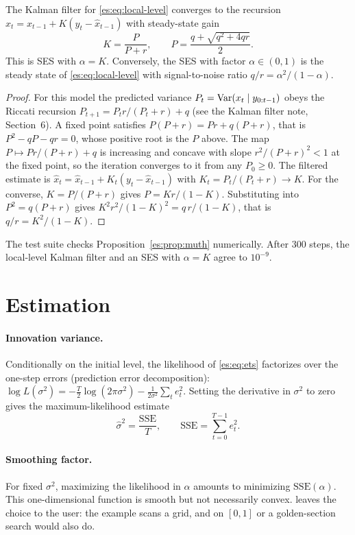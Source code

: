 \begin{proposition}\label{es:prop:muth}
The Kalman filter for \eqref{es:eq:local-level} converges to the recursion
$\hat x_t = \hat x_{t-1} + K(y_t-\hat x_{t-1})$ with steady-state gain
\[
  K = \frac{P}{P+r},\qquad P = \frac{q+\sqrt{q^2+4qr}}{2}.
\]
This is SES with $\alpha=K$. Conversely, the SES with factor $\alpha\in(0,1)$ is the steady state of
\eqref{es:eq:local-level} with signal-to-noise ratio $q/r = \alpha^2/(1-\alpha)$.
\end{proposition}
\begin{proof}
For this model the predicted variance $P_t=\operatorname{Var}(x_t\mid y_{0:t-1})$ obeys the
Riccati recursion $P_{t+1} = P_t r/(P_t+r) + q$ (see the Kalman filter note,
Section~6). A fixed point satisfies $P(P+r)=Pr+q(P+r)$, that is
$P^2-qP-qr=0$, whose positive root is the $P$ above. The map
$P\mapsto Pr/(P+r)+q$ is increasing and concave with slope $r^2/(P+r)^2<1$ at the
fixed point, so the iteration converges to it from any $P_0\ge0$. The filtered
estimate is $\hat x_t = \hat x_{t-1} + K_t(y_t-\hat x_{t-1})$ with
$K_t=P_t/(P_t+r)\to K$. For the converse, $K=P/(P+r)$ gives $P=Kr/(1-K)$.
Substituting into $P^2=q(P+r)$ gives $K^2r^2/(1-K)^2 = q\,r/(1-K)$, that is $q/r=K^2/(1-K)$.
\end{proof}

The  test suite checks Proposition~\ref{es:prop:muth} numerically. After
300 steps, the local-level Kalman filter and an SES with $\alpha=K$ agree to
$10^{-9}$.

\section{Estimation}

\paragraph{Innovation variance.}
Conditionally on the initial level, the likelihood of \eqref{es:eq:ets} factorizes
over the one-step errors (prediction error decomposition):
$\log L(\sigma^2) = -\frac{T}{2}\log(2\pi\sigma^2) - \frac{1}{2\sigma^2}\sum_t e_t^2$.
Setting the derivative in $\sigma^2$ to zero gives the maximum-likelihood
estimate
\[
  \hat\sigma^2 = \frac{\mathrm{SSE}}{T},\qquad \mathrm{SSE}=\sum_{t=0}^{T-1} e_t^2 .
\]

\paragraph{Smoothing factor.}
For fixed $\sigma^2$, maximizing the likelihood in $\alpha$ amounts to minimizing
$\mathrm{SSE}(\alpha)$. This one-dimensional function is smooth but not
necessarily convex.  leaves the choice to the user: the
 example scans a grid, and  on $[0,1]$
or a golden-section search would also do.

